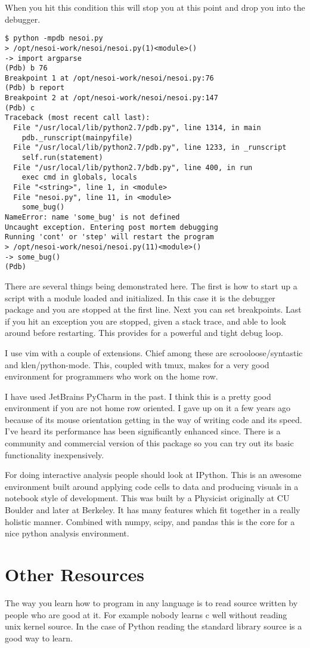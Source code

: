 \documentclass[]{article}
\begin{document}
When you hit this condition this will stop you at this point and drop
you into the debugger.

\begin{verbatim}
$ python -mpdb nesoi.py
> /opt/nesoi-work/nesoi/nesoi.py(1)<module>()
-> import argparse
(Pdb) b 76
Breakpoint 1 at /opt/nesoi-work/nesoi/nesoi.py:76
(Pdb) b report
Breakpoint 2 at /opt/nesoi-work/nesoi/nesoi.py:147
(Pdb) c
Traceback (most recent call last):
  File "/usr/local/lib/python2.7/pdb.py", line 1314, in main
    pdb._runscript(mainpyfile)
  File "/usr/local/lib/python2.7/pdb.py", line 1233, in _runscript
    self.run(statement)
  File "/usr/local/lib/python2.7/bdb.py", line 400, in run
    exec cmd in globals, locals
  File "<string>", line 1, in <module>
  File "nesoi.py", line 11, in <module>
    some_bug()
NameError: name 'some_bug' is not defined
Uncaught exception. Entering post mortem debugging
Running 'cont' or 'step' will restart the program
> /opt/nesoi-work/nesoi/nesoi.py(11)<module>()
-> some_bug()
(Pdb) 
\end{verbatim}

There are several things being demonstrated here. The first is how to
start up a script with a module loaded and initialized. In this case it
is the debugger package and you are stopped at the first line. Next you
can set breakpoints. Last if you hit an exception you are stopped,
given a stack trace, and able to look around before restarting. This
provides for a powerful and tight debug loop.

I use vim with a couple of extensions. Chief among these are
scrooloose/syntastic and klen/python-mode. This, coupled with tmux,
makes for a very good environment for programmers who work on the home
row.

I have used JetBrains PyCharm in the past. I think this is a pretty
good environment if you are not home row oriented. I gave up on it a
few years ago because of its mouse orientation getting in the way of
writing code and its speed. I've heard its performance has been
significantly enhanced since. There is a community and commercial
version of this package so you can try out its basic functionality
inexpensively.

For doing interactive analysis people should look at IPython. This is
an awesome environment built around applying code cells to data and
producing visuals in a notebook style of development. This was built by
a Physicist originally at CU Boulder and later at Berkeley. It has many
features which fit together in a really holistic manner. Combined with
numpy, scipy, and pandas this is the core for a nice python analysis
environment.

\section{Other Resources}

The way you learn how to program in any language is to read source
written by people who are good at it. For example nobody learns c well
without reading unix kernel source. In the case of Python reading the
standard library source is a good way to learn.
\end{document}
